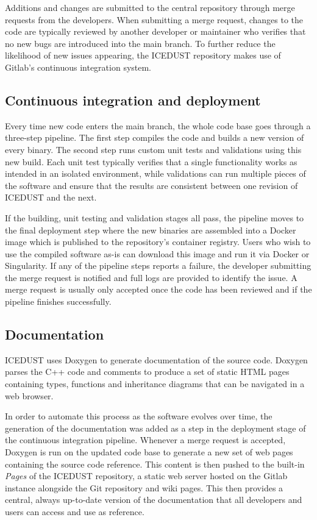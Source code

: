 Additions and changes are submitted to the central repository through merge
requests from the developers. When submitting a merge request, changes to the
code are typically reviewed by another developer or maintainer who verifies that
no new bugs are introduced into the main branch. To further reduce the
likelihood of new issues appearing, the ICEDUST repository makes use of Gitlab's
continuous integration system.

\subsection{Continuous integration and deployment}

Every time new code enters the main branch, the whole code base goes through a
three-step pipeline. The first step compiles the code and builds a new version
of every binary. The second step runs custom unit tests and validations using
this new build. Each unit test typically verifies that a single functionality
works as intended in an isolated environment, while validations can run multiple
pieces of the software and ensure that the results are consistent between one
revision of ICEDUST and the next.

If the building, unit testing and validation stages all pass, the pipeline moves
to the final deployment step where the new binaries are assembled into a Docker
image which is published to the repository's container registry. Users who wish
to use the compiled software as-is can download this image and run it via Docker
or Singularity. If any of the pipeline steps reports a failure, the developer
submitting the merge request is notified and full logs are provided to identify
the issue. A merge request is usually only accepted once the code has been
reviewed and if the pipeline finishes successfully.

\subsection{Documentation}
ICEDUST uses Doxygen to generate documentation of the source code. Doxygen
parses the C++ code and comments to produce a set of static HTML pages
containing types, functions and inheritance diagrams that can be navigated in a
web browser.

In order to automate this process as the software evolves over time, the
generation of the documentation was added as a step in the deployment stage of
the continuous integration pipeline. Whenever a merge request is accepted,
Doxygen is run on the updated code base to generate a new set of web pages
containing the source code reference. This content is then pushed to the
built-in \emph{Pages} of the ICEDUST repository, a static web server hosted on
the Gitlab instance alongside the Git repository and wiki pages. This then
provides a central, always up-to-date version of the documentation that all
developers and users can access and use as reference.




